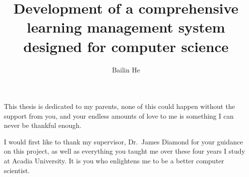 

\title{Development of a comprehensive learning management system designed for
computer science}

\author{Bailin He}







\firstThreePages


\Acknowledgments
This thesis is dedicated to my parents, none of this could happen without the
support from you, and your endless amounts of love to me is something
I can never be thankful enough.

\medskip

I would first like to thank my supervisor, Dr.~James Diamond for your
guidance on this project, as well as everything you taught me over these four
years I study at Acadia University.
It is you who enlightens me to be a better computer scientist.

